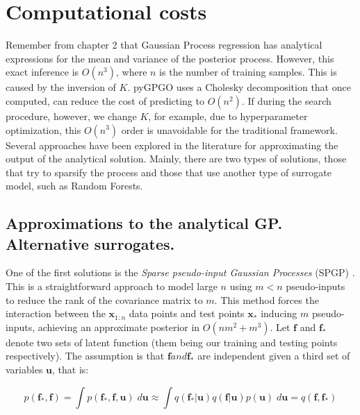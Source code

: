\documentclass[10pt,a4paper,twoside]{book}
\begin{document}
\section{Computational costs}

Remember from chapter 2 that Gaussian Process regression has analytical expressions for the mean and variance of the posterior process. However, this exact inference is $O(n^3)$, where $n$ is the number of training samples. This is caused by the inversion of $K$. pyGPGO uses a Cholesky decomposition that once computed, can reduce the cost of predicting to $O(n^2)$. If during the search procedure, however, we change $K$, for example, due to hyperparameter optimization, this $O(n^3)$ order is unavoidable for the traditional framework. Several approaches have been explored in the literature for approximating the output of the analytical solution. Mainly, there are two types of solutions, those that try to sparsify the process and those that use another type of surrogate model, such as Random Forests.\\

\subsection{Approximations to the analytical GP. Alternative surrogates.}

One of the first solutions is the \textit{Sparse pseudo-input Gaussian Processes} (SPGP) \cite{Snelson2006}. This is a straightforward approach to model large $n$ using $m < n$ pseudo-inputs to reduce the rank of the covariance matrix to $m$. This method forces the interaction between the $\boldsymbol{x}_{1:n}$ data points and test points $\boldsymbol{x}_*$ inducing $m$ pseudo-inputs, achieving an approximate posterior in $O(nm^2 + m^3)$. Let $\boldsymbol{f}$ and $\boldsymbol{f}_*$ denote two sets of latent function (them being our training and testing points respectively). The assumption is that $\boldsymbol{f} and \boldsymbol{f}_*$ are independent given a third set of variables $\boldsymbol{u}$, that is:

\begin{equation}
p\left(\boldsymbol{f}_*, \boldsymbol{f}\right) = \int p(\boldsymbol{f}_*, \boldsymbol{f}, \boldsymbol{u})\; d\boldsymbol{u} \approx \int q(\boldsymbol{f}_*|\boldsymbol{u})q(\boldsymbol{f}|\boldsymbol{u})p(\boldsymbol{u})\; d\boldsymbol{u} = q(\boldsymbol{f}, \boldsymbol{f}_*) 
\end{equation}
\end{document}

